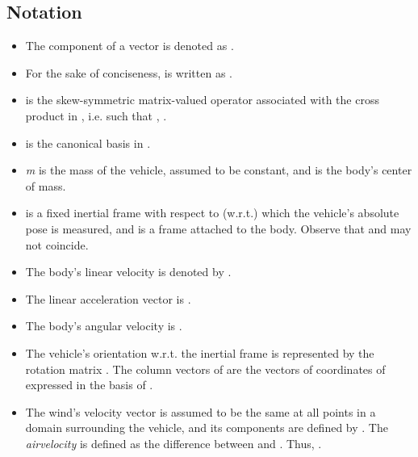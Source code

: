 \documentclass[twocolumn]{autart}
\theoremstyle{definition}
\theoremstyle{definition}
\begin{document}
\subsection{Notation}
\label{sec:notation}
\begin{itemize}
 \item The  component of a vector  is denoted as .
 \item For the sake of conciseness,  is written as .
 \item  is the skew-symmetric matrix-valued operator associated with the cross product in , i.e. such that , .
 \item  is the canonical basis in .
\item \emph{m} is the mass of the vehicle, assumed to be constant, and  is the body's center of mass.
 \item  is a fixed inertial frame with respect to (w.r.t.) which the vehicle's absolute pose is measured,
and  is a frame attached to the body. Observe that  and  may not coincide.



\item The body's linear velocity is denoted by .
\item The linear acceleration vector is .
\item The body's angular velocity is .
\item The vehicle's orientation w.r.t. the inertial frame is represented by the rotation matrix . The column vectors of  are the vectors of coordinates of
 expressed in the basis of  .
\item The wind's velocity vector  is assumed to be the same at all points in a domain surrounding the vehicle, and its components are defined by . The \emph{airvelocity}  is defined as the difference between  and . Thus, .
\end{itemize}
\end{document}
